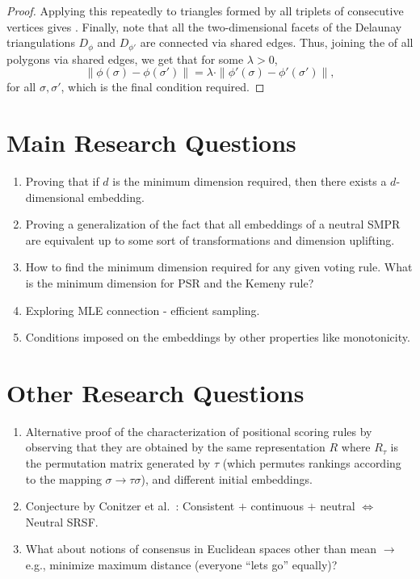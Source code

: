 \documentclass[10pt,letterpaper]{article}
\begin{document}
\begin{proof}
Applying this repeatedly to triangles formed by all triplets of consecutive vertices gives . Finally, note that all the two-dimensional facets of the Delaunay triangulations $D_{\phi}$ and $D_{\phi'}$ are connected via shared edges. Thus, joining the  of all polygons via shared edges, we get that for some $\lambda > 0$,
$$
\|\phi(\sigma)-\phi(\sigma')\| = \lambda \cdot \|\phi'(\sigma)-\phi'(\sigma')\|,
$$
for all $\sigma, \sigma'$, which is the final condition required.
\end{proof}

\section{Main Research Questions}
\begin{enumerate}
\item Proving that if $d$ is the minimum dimension required, then there exists a $d$-dimensional embedding.
\item Proving a generalization of the fact that all embeddings of a neutral SMPR are equivalent up to some sort of transformations and dimension uplifting. 
\item How to find the minimum dimension required for any given voting rule. What is the minimum dimension for PSR and the Kemeny rule?
\item Exploring MLE connection - efficient sampling.
\item Conditions imposed on the embeddings by other properties like monotonicity.
\end{enumerate}

\section{Other Research Questions}
\begin{enumerate}
\item Alternative proof of the characterization of positional scoring rules by observing that they are obtained by the same representation $R$ where $R_{\tau}$ is the permutation matrix generated by $\tau$ (which permutes rankings according to the mapping $\sigma \rightarrow \tau \sigma$), and different initial embeddings. 
\item Conjecture by Conitzer et al.~\cite{CRX09}: Consistent $+$ continuous $+$ neutral $\Leftrightarrow$ Neutral SRSF.
\item What about notions of consensus in Euclidean spaces other than mean $\rightarrow$ e.g., minimize maximum distance (everyone ``lets go'' equally)?
\end{enumerate}
\end{document}
